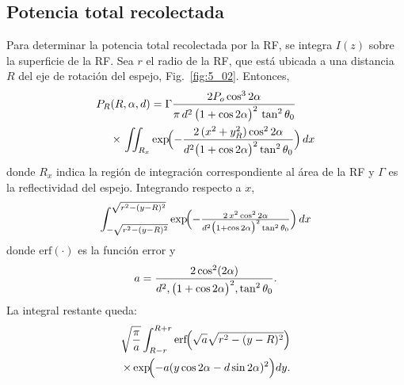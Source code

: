 \documentclass[11pt,a4paper]{article}
\begin{document}
\begin{multicols}{2}
\subsection{Potencia total recolectada}\label{sec:5_01_05}
Para determinar la potencia total recolectada por la RF, se integra $I(z)$ sobre la superficie de la RF. Sea $r$ el radio de la RF, que está ubicada a una distancia $R$ del eje de rotación del espejo, Fig.~\ref{fig:5_02}. Entonces,
%
%
\begin{align}
    P_{R}(R,\alpha,d)&=\Gamma\dfrac{2P_o \cos^3 2\alpha}{\pi \, d^2 \,\bigl(1 + \cos 2\alpha\bigr)^2 \,\tan^2 \theta_0}
    \notag\\
    \times \,\iint_{R_x}&\exp\!\Bigl(-\dfrac{2\,(x^2 +y_R^2)\cos^2 2\alpha}{d^2 \bigl(1 + \cos 2\alpha\bigr)^2 \tan^2 \theta_0}\Bigr) \, dx
    \label{eq:equ5}
\end{align}
%
%
donde $R_x$ indica la región de integración correspondiente al área de la RF y $\Gamma$ es la reflectividad del espejo. Integrando respecto a $x$,
%
%
\begin{align}
    \int_{-\sqrt{r^2 - (y - R)^2}}^{\sqrt{r^2 - (y - R)^2}}
    \exp\!\Bigl(-\tfrac{2\,x^2 \cos^2 2\alpha}{d^2 \bigl(1 + \cos 2\alpha\bigr)^2 \tan^2 \theta_0}\Bigr)
    \, dx
    \label{eq:equ6}
\end{align}
%
donde $\mathrm{erf}(\cdot)$ es la función error y
%
%
\begin{gather}
    a = \frac{2 \cos^2(2\alpha)}{ d^2 ,\bigl(1+\cos 2\alpha\bigr)^2 ,\tan^2 \theta_0}.\notag
\end{gather}
%
%
La integral restante queda:
%
%
\begin{align}
    \sqrt{\frac{\pi}{a}}
    \int_{R-r}^{R+r}
    \mathrm{erf}\!\Bigl(\sqrt{a}\sqrt{r^2 - (y - R)^2} \Bigr)\notag\\
    \times
    \exp\!\Bigl(-a(y\cos 2\alpha - d\sin 2\alpha)^2\Bigr)dy.
    \label{eq:equ7}
\end{align}
%
%

\end{multicols}
\end{document}
